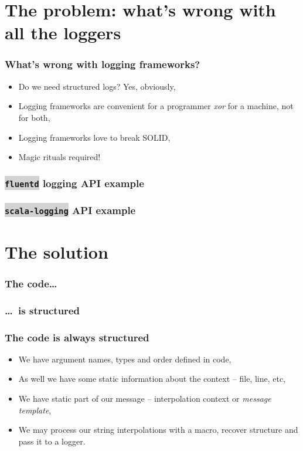 \documentclass[usenames,dvipsnames]{beamer}
\newcommand{\code}[1]{\colorbox{lightgray}{\texttt{#1}}}
\begin{document}
\begin{frame}
\titlepage
\end{frame}

\section{The problem: what's wrong with all the loggers}

\begin{frame}
\frametitle{What's wrong with logging frameworks?}

\begin{itemize}
\item Do we need structured logs? Yes, obviously,
\item Logging frameworks are convenient for a programmer \textit{xor} for a machine, not for both,
\item Logging frameworks love to break SOLID,
\item Magic rituals required!
\end{itemize}
\end{frame}

\begin{frame}
\frametitle{\code{fluentd} logging API example}
\end{frame}

\begin{frame}
\frametitle{\code{scala-logging} API example}
\end{frame}

\section{The solution}
\begin{frame}
\frametitle{The code\dots}
\end{frame}

\begin{frame}
\frametitle{\dots~is structured}
\end{frame}

\begin{frame}
\frametitle{The code is always structured}
\begin{itemize}
\item We have argument names, types and order defined in code,
\item As well we have some static information about the context -- file, line, etc,
\item We have static part of our message -- interpolation context or \textit{message template},
\item We may process our string interpolations with a macro, recover structure and pass it to a logger.
\end{itemize}
\end{frame}
\end{document}
